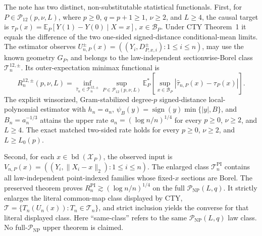 The note has two distinct, non-substitutable statistical functionals.  First, for \(P\in\mathcal P_{12}(p,\nu,L)\), where \(p\geq0\), \(q=p+1\geq1\), \(\nu\geq2\), and \(L\geq4\), the causal target is \(\tau_P(x)=\mathbb E_P[Y(1)-Y(0)\mid X=x]\), \(x\in\mathcal B_P\).  Under CTY Theorem~1 it equals the difference of the two one-sided signed-distance conditional-mean limits.  The estimator observes \(U^{\pm}_{n,P}(x)=((Y_i,D^{\pm}_{P,x,i}):1\leq i\leq n)\), may use the known geometry \(G_P\), and belongs to the law-independent sectionwise-Borel class \(\mathcal T_n^{12,\pm}\).  Its outer-expectation minimax functional is
\[
 R_n^{12,\pm}(p,\nu,L)=\inf_{\widehat\tau_n\in\mathcal T_n^{12,\pm}}
 \sup_{P\in\mathcal P_{12}(p,\nu,L)}
 \mathbb E_P^*\!\left[\sup_{x\in\mathcal B_P}|\widehat\tau_{n,P}(x)-\tau_P(x)|\right].
\]
The explicit winsorized, Gram-stabilized degree-\(p\) signed-distance local-polynomial estimator with \(h_n=a_n\), \(\psi_B(y)=\operatorname{sign}(y)\min\{|y|,B\}\), and \(B_n=a_n^{-1/3}\) attains the upper rate \(a_n=(\log n/n)^{1/4}\) for every \(p\geq0\), \(\nu\geq2\), and \(L\geq4\).  The exact matched two-sided rate holds for every \(p\geq0\), \(\nu\geq2\), and \(L\geq L_0(p)\).

Second, for each \(x\in\operatorname{bd}(\mathcal X_P)\), the observed input is \(V_{n,P}(x)=((Y_i,\lVert X_i-x\rVert_2):1\leq i\leq n)\).  The enlarged class \(\mathcal T_n^{\mathrm{PI}}\) contains all law-independent point-indexed families whose fixed-\(x\) sections are Borel.  The preserved theorem proves \(R_n^{\mathrm{PI}}\gtrsim(\log n/n)^{1/4}\) on the full \(\mathcal P_{\mathrm{NP}}(L,q)\).  It strictly enlarges the literal common-map class displayed by CTY, \(\mathcal T=\{T_n(U_n(x)):T_n\in\mathcal T_n\}\), and strict inclusion yields the converse for that literal displayed class.  Here ``same-class'' refers to the same \(\mathcal P_{\mathrm{NP}}(L,q)\) law class.  No full-\(\mathcal P_{\mathrm{NP}}\) upper theorem is claimed.